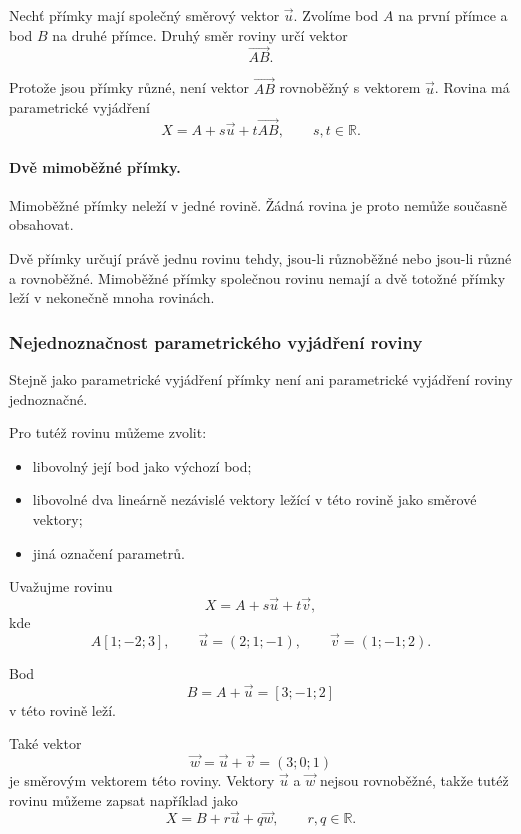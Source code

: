 Nechť přímky mají společný směrový vektor $\vec{u}$. Zvolíme bod $A$
na první přímce a bod $B$ na druhé přímce. Druhý směr roviny určí
vektor
\[
    \overrightarrow{AB}.
\]

Protože jsou přímky různé, není vektor $\overrightarrow{AB}$
rovnoběžný s vektorem $\vec{u}$. Rovina má parametrické vyjádření
\[
    X=A+s\vec{u}+t\overrightarrow{AB},
    \qquad
    s,t\in\mathbb{R}.
\]

\paragraph{Dvě mimoběžné přímky.}

Mimoběžné přímky neleží v jedné rovině. Žádná rovina je proto nemůže
současně obsahovat.

\begin{remark}
    Dvě přímky určují právě jednu rovinu tehdy, jsou-li různoběžné
    nebo jsou-li různé a rovnoběžné. Mimoběžné přímky společnou
    rovinu nemají a dvě totožné přímky leží v nekonečně mnoha rovinách.
\end{remark}


\subsubsection{Nejednoznačnost parametrického vyjádření roviny}
\label{subsubsec:Nonuniqueness_parametric_plane}

Stejně jako parametrické vyjádření přímky není ani parametrické
vyjádření roviny jednoznačné.

Pro tutéž rovinu můžeme zvolit:

\begin{itemize}
    \item libovolný její bod jako výchozí bod;
    \item libovolné dva lineárně nezávislé vektory ležící v této
    rovině jako směrové vektory;
    \item jiná označení parametrů.
\end{itemize}

Uvažujme rovinu
\[
    X=A+s\vec{u}+t\vec{v},
\]
kde
\[
    A[1;-2;3],
    \qquad
    \vec{u}=(2;1;-1),
    \qquad
    \vec{v}=(1;-1;2).
\]

Bod
\[
    B=A+\vec{u}=[3;-1;2]
\]
v této rovině leží.

Také vektor
\[
    \vec{w}
    =
    \vec{u}+\vec{v}
    =
    (3;0;1)
\]
je směrovým vektorem této roviny. Vektory $\vec{u}$ a $\vec{w}$
nejsou rovnoběžné, takže tutéž rovinu můžeme zapsat například jako
\[
    X=B+r\vec{u}+q\vec{w},
    \qquad
    r,q\in\mathbb{R}.
\]

